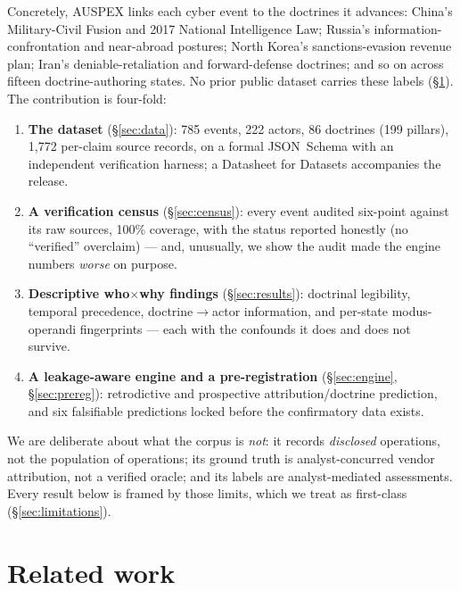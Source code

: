 \documentclass[11pt]{article}
\begin{document}
Concretely, AUSPEX links each cyber event to the doctrines it advances: China's Military-Civil Fusion
and 2017 National Intelligence Law; Russia's information-confrontation and near-abroad postures; North
Korea's sanctions-evasion revenue plan; Iran's deniable-retaliation and forward-defense doctrines;
and so on across fifteen doctrine-authoring states. No prior public dataset carries these labels
(\S\ref{sec:related}). The contribution is four-fold:

\begin{enumerate}\itemsep2pt
\item \textbf{The dataset} (\S\ref{sec:data}): 785 events, 222 actors, 86 doctrines (199 pillars),
1{,}772 per-claim source records, on a formal JSON~Schema with an independent verification harness;
a Datasheet for Datasets \citep{gebru2021} accompanies the release.
\item \textbf{A verification census} (\S\ref{sec:census}): every event audited six-point against its
raw sources, 100\% coverage, with the status reported honestly (no ``verified'' overclaim) --- and,
unusually, we show the audit made the engine numbers \emph{worse} on purpose.
\item \textbf{Descriptive who$\times$why findings} (\S\ref{sec:results}): doctrinal legibility,
temporal precedence, doctrine$\rightarrow$actor information, and per-state modus-operandi fingerprints
--- each with the confounds it does and does not survive.
\item \textbf{A leakage-aware engine and a pre-registration} (\S\ref{sec:engine},
\S\ref{sec:prereg}): retrodictive and prospective attribution/doctrine prediction, and six
falsifiable predictions locked before the confirmatory data exists.
\end{enumerate}

We are deliberate about what the corpus is \emph{not}: it records \emph{disclosed} operations, not the
population of operations; its ground truth is analyst-concurred vendor attribution, not a verified
oracle; and its labels are analyst-mediated assessments. Every result below is framed by those limits,
which we treat as first-class (\S\ref{sec:limitations}).

\section{Related work}\label{sec:related}
\end{document}
